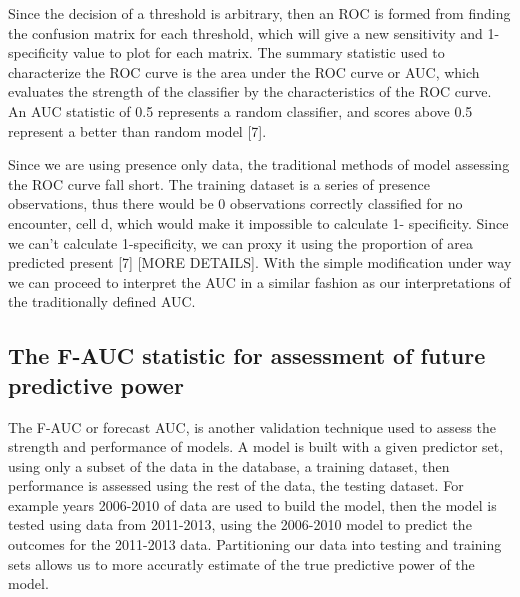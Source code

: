\noindent Since the decision of a threshold is arbitrary, then an ROC is formed from finding the confusion matrix for each threshold, which will give a new sensitivity and 1-specificity value to plot for each matrix. The summary statistic used to characterize the ROC curve is the area under the ROC curve or AUC, which evaluates the strength of the classifier by the characteristics of the ROC curve. An AUC statistic of 0.5 represents a random classifier, and scores above 0.5 represent a better than random model [7].    \newline

\noindent Since we are using presence only data, the traditional methods of model assessing the ROC curve fall short. The training dataset is a series of presence observations, thus there would be 0 observations correctly classified for no encounter, cell d,  which would make it impossible to calculate 1- specificity. Since we can't calculate 1-specificity, we can proxy it using the proportion of area predicted present [7] [MORE DETAILS].  With the simple modification under way we can proceed to interpret the AUC in a similar fashion as our interpretations of the traditionally defined AUC.  \newline


\subsection{The F-AUC statistic for assessment of future predictive power }

The F-AUC or forecast AUC, is another validation technique used to assess the strength and performance of models. A model is built with a given predictor set, using only a subset of the data in the database, a training dataset, then performance is assessed using the rest of the data, the testing dataset. For example years 2006-2010 of data are used to build the model, then the model is tested using data from 2011-2013, using the 2006-2010 model to predict the outcomes for the 2011-2013 data. Partitioning our data into testing and training sets allows us to more accuratly estimate of the true predictive power of the model. 

